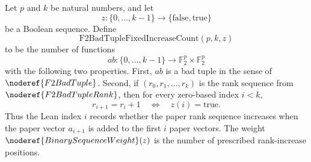 \begin{definition}
Let \(p\) and \(k\) be natural numbers, and let
\[
  z:\{0,\ldots,k-1\}\to\{\mathrm{false},\mathrm{true}\}
\]
be a Boolean sequence. Define
\[
  \mathrm{F2BadTupleFixedIncreaseCount}(p,k,z)
\]
to be the number of functions
\[
  ab:\{0,\ldots,k-1\}\to \mathbb F_2^p\times\mathbb F_2^p
\]
with the following two properties. First, \(ab\) is a bad tuple in the sense of
\(\noderef{F2BadTuple}\). Second, if \((r_0,r_1,\ldots,r_k)\) is the rank
sequence from \(\noderef{F2BadTupleRank}\), then for every zero-based index
\(i<k\),
\[
  r_{i+1}=r_i+1
  \quad\Longleftrightarrow\quad
  z(i)=\mathrm{true}.
\]
Thus the Lean index \(i\) records whether the paper rank sequence increases
when the paper vector \(a_{i+1}\) is added to the first \(i\) paper vectors.
The weight \(\noderef{BinarySequenceWeight}(z)\) is the number of prescribed
rank-increase positions.
\end{definition}
